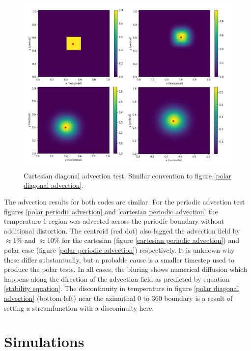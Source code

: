 \documentclass{article}
\begin{document}
\begin{figure}[h!]
	\centering 
	\includegraphics{cartesianDiagonal/CartesianDiagonalFigure.jpg}
	\caption{Cartesian diagonal advection test. Similar convention to figure \ref{polar diagonal advection}. }
	\label{cartesian diagonal advection}
\end{figure}

\noindent The advection results for both codes are similar. For the periodic advection test figures \ref{polar periodic advection} and \ref{cartesian periodic advection} the temperature 1 region was advected across the periodic boundary without additional distortion. The centroid (red dot) also lagged the advection field by $\approx 1 \%$ and $\approx 10 \%$ for the cartesian (figure \ref{cartesian periodic advection}) and polar case (figure \ref{polar periodic advection}) respectively. It is unknown why these differ substantually, but a probable cause is a smaller timestep used to produce the polar tests. In all cases, the bluring shows numerical diffusion which happens along the direction of the advection field as predicted by equation \ref{stability equation}. The discontinuity in temperature in figure \ref{polar diagonal advection} (bottom left) near the azimuthal 0 to 360 boundary is a result of setting a streamfunction with a disconinuity here. 


\section*{Simulations}
\end{document}
